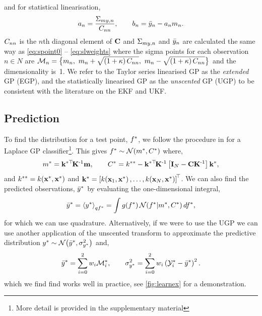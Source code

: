 \documentclass{article} %
\begin{document}
and for statistical linearisation,
\begin{equation}
    a_n = \frac{\Sigma_{my,n}}{C_{nn}},
    \qquad
    b_n = \bar{y}_n - a_nm_n.
\end{equation}
$C_{nn}$ is the $n$th diagonal element of $\mathbf{C}$ and
$\Sigma_{my,n}$ and $\bar{y}_n$ are calculated the same way as
\eqref{eq:spoint0} -- \eqref{eq:slweights} where the sigma points for each
observation $n \in N$ are $\mathcal{M}_{n} = \big\{m_n,~m_n +
\sqrt{\left({1 + \kappa}\right)C_{nn}},~m_n - \sqrt{\left({1 +
        \kappa}\right)C_{nn}}\big\}$ and the dimensionality is~1. We refer to
the Taylor series linearised GP as the \emph{extended} GP (EGP), and the
statistically linearised GP as the \emph{unscented} GP (UGP) to be consistent
with the literature on the EKF and UKF.

\subsection{Prediction}

To find the distribution for a test point, $f^{*}$, we follow the
procedure in \cite{Rasmussen2006} for a Laplace GP classifier\footnote{More
    detail is provided in the supplementary material}. This gives
$f^{*} \sim \mathcal{N}\!\left({m^{*}, C^{*}}\right)$ where,
\begin{equation}
    m^{*} = \mathbf{k}^{*\top}\!\mathbf{K}^{\text{-}1}\mathbf{m},
    \qquad
    C^{*} = k^{**} - \mathbf{k}^{*\top}\!\mathbf{K}^{\text{-}1}\left[{\mathbf{I}_{N} -
        \mathbf{C}\mathbf{K}^{\text{-}1}}\right]\mathbf{k}^{*},
\end{equation}
and $k^{**} = k\!\left({\mathbf{x}^{*}, \mathbf{x}^{*}}\right)$ and $\mathbf{k}^{*}
= \left[{k\!\left({\mathbf{x}_1, \mathbf{x}^{*}}\right), \ldots, k\!\left({\mathbf{x}_N,
        \mathbf{x}^{*}}\right)}\right]^{\!\top}$. We can also find the predicted observations,
$\bar{y}^{*}$ by evaluating the one-dimensional integral,
\begin{equation}
    \bar{y}^{*} = \left\langle{\ensuremath{y}\ensuremath{^{*}}}\right\rangle_{qf^{*}} = \int
        g\!\left({{f^{*}}}\right) \mathcal{N}\!\left({f^{*}}\middle\vert{\ensuremath{m}\ensuremath{^{*}},
            \ensuremath{C}\ensuremath{^{*}}}\right) df^{*},
\end{equation}
for which we can use quadrature. Alternatively, if we were to use the UGP we
can use another application of the unscented transform to approximate the
predictive distribution $y^{*} \sim \mathcal{N}\!\left({\bar{y}^{*},
    \sigma^2_{y^{*}}}\right)$ and,
\begin{equation}
    \bar{y}^{*} = \sum^2_{i=0} w_i \mathcal{M}_i^{*}, \qquad 
    \sigma^2_{y^{*}} = \sum^2_{i=0} w_i \left({\mathcal{Y}_i^{*} -
        \bar{y}^{*}}\right)^2.
    \label{eq:slpred}
\end{equation}
which we find find works well in practice, see \autoref{fig:learnex} for a
demonstration.
\end{document}
